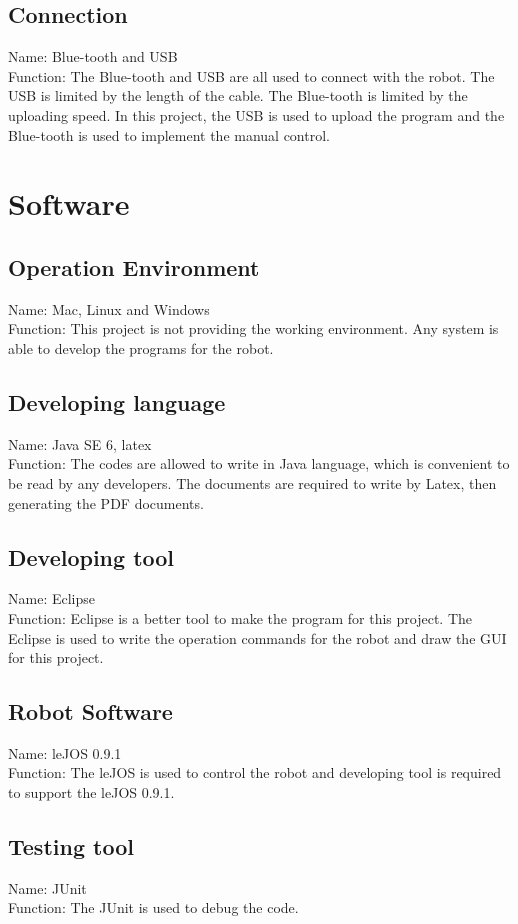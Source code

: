 \documentclass[11pt, a4paper]{report}
\begin{document}
\subsection{Connection}
Name: Blue-tooth and USB \\
Function: The Blue-tooth and USB are all used to connect with the robot. The USB is limited by the length of the cable. The Blue-tooth is limited by the uploading speed. In this project, the USB is used to upload the program and the Blue-tooth is used to implement the manual control.
\section{Software}
\subsection{Operation Environment}
Name: Mac, Linux and Windows\\
Function: This project is not providing the working environment. Any system is able to develop the programs for the robot.
\subsection{Developing language}
Name: Java SE 6, latex\\
Function: The codes are allowed to write in Java language, which is convenient to be read by any developers. The documents are required to write by Latex, then generating the PDF documents.
\subsection{Developing tool}
Name: Eclipse\\
Function: Eclipse is a better tool to make the program for this project. The Eclipse is used to write the operation commands for the robot and draw the GUI for this project.
\subsection{Robot Software}
Name: leJOS 0.9.1\\
 Function: The leJOS is used to control the robot and developing tool is required to support the leJOS 0.9.1.
 \subsection{Testing tool}
 Name: JUnit\\
 Function: The JUnit is used to debug the code.
\end{document}
